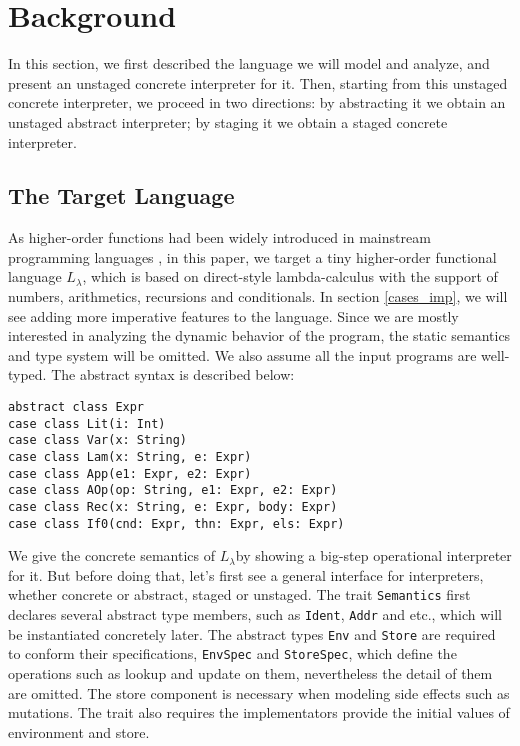 \newcommand{\TLang}{$L_\lambda$}

\section{Background}

In this section, we first described the language we will model and analyze, and present an unstaged concrete 
interpreter for it. Then, starting from this unstaged concrete interpreter, we proceed in two directions:
by abstracting it we obtain an unstaged abstract interpreter; by staging it we obtain a staged concrete
interpreter.

\subsection{The Target Language} \label{bg_lang}

As higher-order functions had been widely introduced in mainstream programming languages , in this paper, 
we target a tiny higher-order functional language \TLang, which is based on direct-style lambda-calculus
with the support of numbers, arithmetics, recursions and conditionals.
In section \ref{cases_imp}, we will see adding more imperative features to the language.
Since we are mostly interested in analyzing the dynamic behavior of the program, the static semantics and
type system will be omitted. We also assume all the input programs are well-typed.
The abstract syntax is described below:

\begin{lstlisting}
abstract class Expr
case class Lit(i: Int)
case class Var(x: String)
case class Lam(x: String, e: Expr)
case class App(e1: Expr, e2: Expr)
case class AOp(op: String, e1: Expr, e2: Expr)
case class Rec(x: String, e: Expr, body: Expr)
case class If0(cnd: Expr, thn: Expr, els: Expr)
\end{lstlisting}

We give the concrete semantics of \TLang by showing a big-step operational interpreter for it.
But before doing that, let's first see a general interface for interpreters, whether concrete or abstract, 
staged or unstaged. The trait \texttt{Semantics} first declares several abstract type members, such as \texttt{Ident},
\texttt{Addr} and etc., which will be instantiated concretely later. The abstract types \texttt{Env} and \texttt{Store}
are required to conform their specifications, \texttt{EnvSpec} and \texttt{StoreSpec}, which define 
the operations such as lookup and update on them, nevertheless the detail of them are omitted.  
The store component is necessary when modeling side effects such as mutations. 
The trait also requires the implementators provide the initial values of environment and store.

